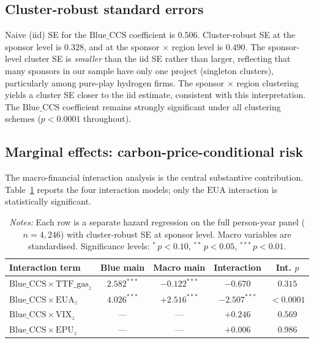 \documentclass[11pt,a4paper]{article}
\newcommand{\BlueCCS}{\mathrm{Blue\_CCS}}
\newcommand{\EUA}{\mathrm{EUA}}
\begin{document}
\subsection{Cluster-robust standard errors}

Naive (iid) SE for the $\BlueCCS$ coefficient is $0.506$. Cluster-robust SE at the sponsor level is $0.328$, and at the sponsor $\times$ region level is $0.490$. The sponsor-level cluster SE is \emph{smaller} than the iid SE rather than larger, reflecting that many sponsors in our sample have only one project (singleton clusters), particularly among pure-play hydrogen firms. The sponsor $\times$ region clustering yields a cluster SE closer to the iid estimate, consistent with this interpretation. The $\BlueCCS$ coefficient remains strongly significant under all clustering schemes ($p < 0.0001$ throughout).

\subsection{Marginal effects: carbon-price-conditional risk}

The macro-financial interaction analysis is the central substantive contribution. Table~\ref{tab:interactions} reports the four interaction models; only the $\EUA$ interaction is statistically significant.

\begin{table}[H]
\centering
\caption{Macro-financial interaction effects on $\BlueCCS$ hazard.}
\label{tab:interactions}
\small
\begin{tabular}{lcccc}
\toprule
\textbf{Interaction term} & \textbf{Blue main} & \textbf{Macro main} & \textbf{Interaction} & \textbf{Int. $p$} \\
\midrule
$\BlueCCS \times \mathrm{TTF\_gas}_z$ & $2.582^{***}$ & $-0.122^{***}$ & $-0.670$ & $0.315$ \\
\textbf{$\BlueCCS \times \EUA_z$} & $\mathbf{4.026^{***}}$ & $\mathbf{+2.516^{***}}$ & $\mathbf{-2.507^{***}}$ & $\mathbf{<0.0001}$ \\
$\BlueCCS \times \mathrm{VIX}_z$ & --- & --- & $+0.246$ & $0.569$ \\
$\BlueCCS \times \mathrm{EPU}_z$ & --- & --- & $+0.006$ & $0.986$ \\
\bottomrule
\end{tabular}
\caption*{\footnotesize \textit{Notes:} Each row is a separate hazard regression on the full person-year panel ($n = 4{,}246$) with cluster-robust SE at sponsor level. Macro variables are standardised. Significance levels: $^*\,p<0.10$, $^{**}\,p<0.05$, $^{***}\,p<0.01$.}
\end{table}
\end{document}
